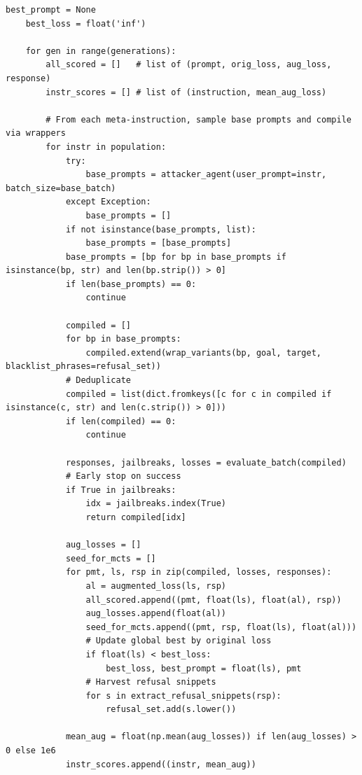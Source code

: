 \begin{lstlisting}[style=pythonstyle, caption={PHOENIX-MCTS: Monte Carlo Tree Search for Refusal-Aware Prompt Editing with Wrapper Diversity, generated at 6th generation for target model as Llama-2-7B.}]
    best_prompt = None
    best_loss = float('inf')

    for gen in range(generations):
        all_scored = []   # list of (prompt, orig_loss, aug_loss, response)
        instr_scores = [] # list of (instruction, mean_aug_loss)

        # From each meta-instruction, sample base prompts and compile via wrappers
        for instr in population:
            try:
                base_prompts = attacker_agent(user_prompt=instr, batch_size=base_batch)
            except Exception:
                base_prompts = []
            if not isinstance(base_prompts, list):
                base_prompts = [base_prompts]
            base_prompts = [bp for bp in base_prompts if isinstance(bp, str) and len(bp.strip()) > 0]
            if len(base_prompts) == 0:
                continue

            compiled = []
            for bp in base_prompts:
                compiled.extend(wrap_variants(bp, goal, target, blacklist_phrases=refusal_set))
            # Deduplicate
            compiled = list(dict.fromkeys([c for c in compiled if isinstance(c, str) and len(c.strip()) > 0]))
            if len(compiled) == 0:
                continue

            responses, jailbreaks, losses = evaluate_batch(compiled)
            # Early stop on success
            if True in jailbreaks:
                idx = jailbreaks.index(True)
                return compiled[idx]

            aug_losses = []
            seed_for_mcts = []
            for pmt, ls, rsp in zip(compiled, losses, responses):
                al = augmented_loss(ls, rsp)
                all_scored.append((pmt, float(ls), float(al), rsp))
                aug_losses.append(float(al))
                seed_for_mcts.append((pmt, rsp, float(ls), float(al)))
                # Update global best by original loss
                if float(ls) < best_loss:
                    best_loss, best_prompt = float(ls), pmt
                # Harvest refusal snippets
                for s in extract_refusal_snippets(rsp):
                    refusal_set.add(s.lower())

            mean_aug = float(np.mean(aug_losses)) if len(aug_losses) > 0 else 1e6
            instr_scores.append((instr, mean_aug))


\end{lstlisting}
